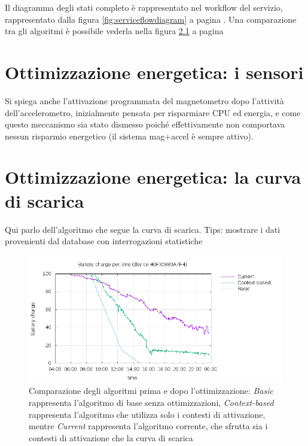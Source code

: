 \documentclass[a4paper,10pt]{memoir}
\begin{document}
Il diagramma degli stati completo è rappresentato nel workflow del servizio, rappresentato dalla figura \ref{fig:serviceflowdiagram} a pagina \pageref{fig:serviceflowdiagram}. Una comparazione tra gli algoritmi è possibile vederla nella figura \ref{fig:batterychart} a pagina \pageref{fig:batterychart}

\chapter{Ottimizzazione energetica: i sensori}
\label{chapter:sensori}

Si spiega anche l'attivazione programmata del magnetometro dopo l'attività dell'accelerometro, inizialmente pensata per risparmiare CPU ed energia, e come questo meccanismo sia stato dismesso poiché effettivamente non comportava nessun risparmio energetico (il sistema mag+accel è sempre attivo).

\chapter{Ottimizzazione energetica: la curva di scarica}
\label{chapter:batteria}

Qui parlo dell'algoritmo che segue la curva di scarica. Tips: mostrare i dati provenienti dal database con interrogazioni statistiche

\begin{figure}[ht]
\centering
\label{fig:batterychart}
\caption{Comparazione degli algoritmi prima e dopo l'ottimizzazione: \textit{Basic} rappresenta l'algoritmo di base senza ottimizzazioni, \textit{Context-based} rappresenta l'algoritmo che utilizza solo i contesti di attivazione, mentre \textit{Current} rappresenta l'algoritmo corrente, che sfrutta sia i contesti di attivazione che la curva di scarica}
\includegraphics[width=\textwidth]{database/batteryplot}
\end{figure}
\end{document}
